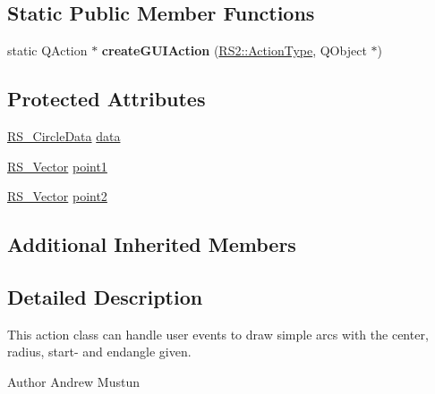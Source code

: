 \subsection*{Static Public Member Functions}
\begin{DoxyCompactItemize}
\item 
\hypertarget{classRS__ActionDrawCircle2P_a95419f6a0f69495754cb7971f8ab864e}{static Q\-Action $\ast$ {\bfseries create\-G\-U\-I\-Action} (\hyperlink{classRS2_afe3523e0bc41fd637b892321cfc4b9d7}{R\-S2\-::\-Action\-Type}, Q\-Object $\ast$)}\label{classRS__ActionDrawCircle2P_a95419f6a0f69495754cb7971f8ab864e}

\end{DoxyCompactItemize}
\subsection*{Protected Attributes}
\begin{DoxyCompactItemize}
\item 
\hyperlink{classRS__CircleData}{R\-S\-\_\-\-Circle\-Data} \hyperlink{classRS__ActionDrawCircle2P_af95bc65a82656e4e5d740e9f8e9abd41}{data}
\item 
\hyperlink{classRS__Vector}{R\-S\-\_\-\-Vector} \hyperlink{classRS__ActionDrawCircle2P_a111a559b7dd5946befd13893a5beb630}{point1}
\item 
\hyperlink{classRS__Vector}{R\-S\-\_\-\-Vector} \hyperlink{classRS__ActionDrawCircle2P_a3497d07cd675dcdf3aad478f973a2cca}{point2}
\end{DoxyCompactItemize}
\subsection*{Additional Inherited Members}


\subsection{Detailed Description}
This action class can handle user events to draw simple arcs with the center, radius, start-\/ and endangle given.

\begin{DoxyAuthor}{Author}
Andrew Mustun 
\end{DoxyAuthor}


